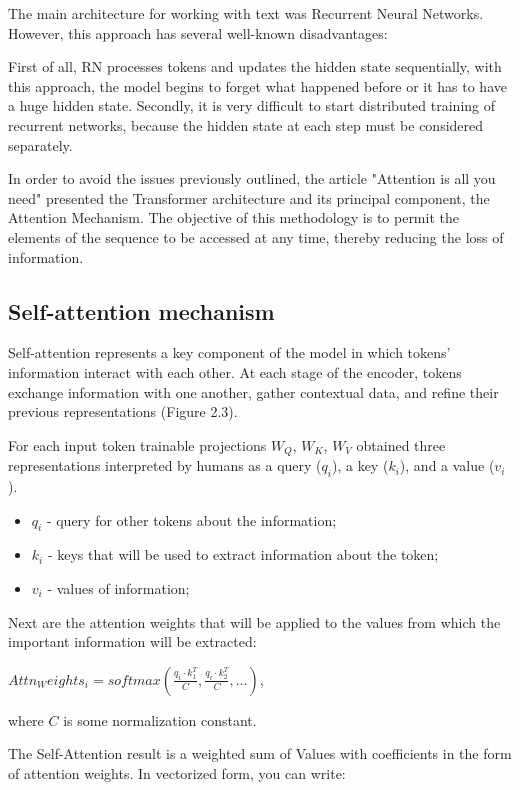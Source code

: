 \documentclass[PMI,VKR]{HSEUniversity}
\begin{document}
The main architecture for working with text was Recurrent Neural Networks. However, this approach has several well-known disadvantages:

First of all, RN processes tokens and updates the hidden state sequentially, with this approach, the model begins to forget what happened before or it has to have a huge hidden state.
Secondly, it is very difficult to start distributed training of recurrent networks, because the hidden state at each step must be considered separately.

In order to avoid the issues previously outlined, the article "Attention is all you need" \cite{attention:2017} presented the Transformer architecture and its principal component, 
the Attention Mechanism. The objective of this methodology is to permit the elements of the sequence to be accessed at any time, thereby reducing the loss of information.

\subsection{Self-attention mechanism}

Self-attention represents a key component of the model in which tokens' information interact with each other.
At each stage of the encoder, tokens exchange information with one another, gather contextual data, and refine their previous representations (Figure 2.3). 

For each input token trainable projections $W_Q$, $W_K$, $W_V$ obtained three representations interpreted by humans as a query ($q_i$), a key ($k_i$), and a value ($v_i$).
\begin{itemize}
    \item $q_i$ - query for other tokens about the information;
    \item $k_i$ - keys that will be used to extract information about the token;
    \item $v_i$ - values of information;
\end{itemize}

Next are the attention weights that will be applied to the values from which the important information will be extracted:
\begin{center}
    $Attn_Weights_{i} = softmax(\frac{q_i \cdot k_{1}^T}{C}, \frac{q_i \cdot k_{2}^T}{C}, \dots)$,
\end{center}

where $C$ is some normalization constant.

The Self-Attention result is a weighted sum of Values with coefficients in the form of attention weights. In vectorized form, you can write:
\end{document}
